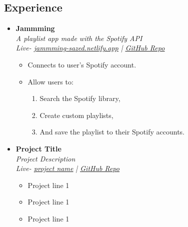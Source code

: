 \documentclass[11pt, oneside, a4paper, titlepage]{article}
\newcommand\experienceVSpace{\vspace{-0.1cm}}
\begin{document}
\begin{tcolorbox}
\begin{minipage}[t]{11cm}
\begin{tcolorbox}[grow to right by=0.75cm,colframe=white,colback=white]
      \section*{Experience}
      \begin{itemize}
        \item
        {
          \textbf{Jammming} \\
          \textit{A playlist app made with the Spotify API} \\
          \textit{Live-  \href{https://jammming-sazed.netlify.app}{\underline{jammming-sazed.netlify.app}} | \href{https://github.com/SazedWorldbringer/codecademy-jammming}{\underline{GitHub Repo}}} \\
          \vspace*{-0.7cm}
          \begin{itemize}
            \item Connects to user's Spotify account.
              \experienceVSpace
            \item {Allow users to:
                \vspace{-0.2cm}
                \begin{enumerate} 
                  \item{Search the Spotify library,}
                    \vspace{-0.2cm}
                  \item{Create custom playlists,} 
                    \vspace{-0.2cm}
                  \item{And save the playlist to their Spotify accounts.}
                \end{enumerate}
              }
          \end{itemize}
        }

        \item
        {
          \textbf{Project Title} \\
          \textit{Project Description} \\
          \textit{Live- \href{url}{\underline{project name}} | \href{https://github.com/SazedWorldbringer}{\underline{GitHub Repo}}} \\
          \vspace*{-0.7cm}
          \begin{itemize}
            \item Project line 1
              \experienceVSpace
            \item Project line 1
              \experienceVSpace
            \item Project line 1
          \end{itemize}
        }


\end{itemize}
\end{tcolorbox}
\end{minipage}
\end{tcolorbox}
\end{document}
